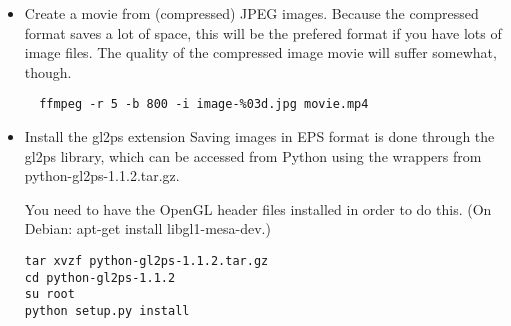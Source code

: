 \begin{enumerate}
\begin{itemize}
\item Create a movie from (compressed) JPEG images.
Because the compressed format saves a lot of space, this will be the prefered format if you have lots of image files. The quality of the compressed image movie will suffer somewhat, though.
\begin{verbatim}
  ffmpeg -r 5 -b 800 -i image-%03d.jpg movie.mp4
\end{verbatim}


\item Install the gl2ps extension
Saving images in EPS format is done through the gl2ps library, which can be accessed from Python using the wrappers from python-gl2ps-1.1.2.tar.gz.

You need to have the OpenGL header files installed in order to do this. (On Debian: apt-get install libgl1-mesa-dev.)

\begin{verbatim}
tar xvzf python-gl2ps-1.1.2.tar.gz
cd python-gl2ps-1.1.2
su root
python setup.py install
\end{verbatim}

\end{itemize}
\end{enumerate}


